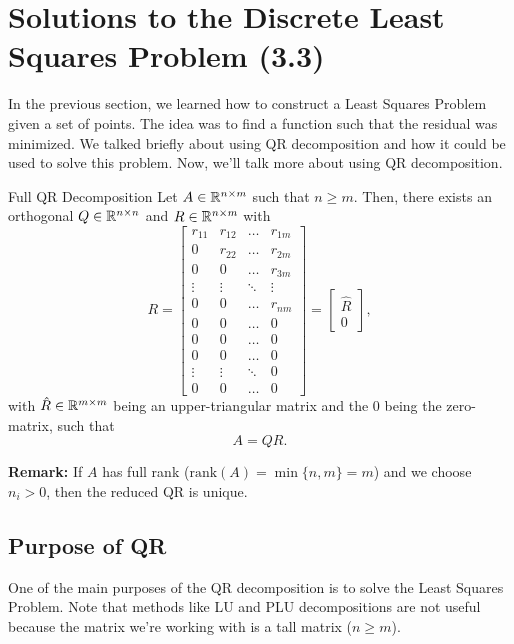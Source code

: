 \documentclass[letterpaper]{article}
\newcommand{\0}{\mathbf{0}}
\begin{document}
\section{Solutions to the Discrete Least Squares Problem (3.3)}
In the previous section, we learned how to construct a Least Squares Problem given a set of points. The idea was to find a function such that the residual was minimized. We talked briefly about using QR decomposition and how it could be used to solve this problem. Now, we'll talk more about using QR decomposition. 

\begin{theorem}{Full QR Decomposition}{}
    Let $A \in \mathbb{R}^{n \times m}$ such that $n \geq m$. Then, there exists an orthogonal $Q \in \mathbb{R}^{n \times n}$ and $R \in \mathbb{R}^{n \times m}$ with 
    \[R = \begin{bmatrix}
        r_{11} & r_{12} & \hdots & r_{1m} \\ 
        0 & r_{22} & \hdots & r_{2m} \\
        0 & 0 & \hdots & r_{3m} \\ 
        \vdots & \vdots & \ddots & \vdots \\ 
        0 & 0 & \hdots & r_{nm} \\ 
        0 & 0 & \hdots & 0 \\ 
        0 & 0 & \hdots & 0 \\ 
        0 & 0 & \hdots & 0 \\ 
        \vdots & \vdots & \ddots & 0 \\ 
        0 & 0 & \hdots & 0
    \end{bmatrix} = \begin{bmatrix}
        \hat{R} \\ 0
    \end{bmatrix},\]
    with $\hat{R} \in \mathbb{R}^{m \times m}$ being an upper-triangular matrix and the 0 being the zero-matrix, such that \[A = QR.\]
\end{theorem}
\textbf{Remark:} If $A$ has full rank ($\text{rank}(A) = \min\{n, m\} = m$) and we choose $n_i > 0$, then the reduced QR is unique. 

\subsection{Purpose of QR}
One of the main purposes of the QR decomposition is to solve the Least Squares Problem. Note that methods like LU and PLU decompositions are not useful because the matrix we're working with is a tall matrix ($n \geq m$). 
\end{document}
